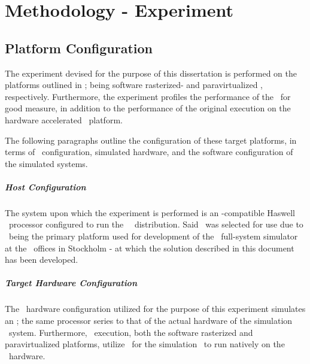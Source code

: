 
\chapter{Methodology - Experiment}
\label{cha:methodologyexperiment}

\section{Platform Configuration}
\label{sec:methodologyexperiment_platformconfiguration}
The experiment devised for the purpose of this dissertation is performed on the platforms outlined in ; being software rasterized- and paravirtualized \dvttermsimics , respectively.
Furthermore, the experiment profiles the performance of the \dvttermreferencesolution\ for good measure, in addition to the performance of the original execution on the hardware accelerated \dvttermhost\ platform. %

The following paragraphs outline the configuration of these target platforms, in terms of \dvttermhost\ configuration, simulated hardware, and the software configuration of the simulated systems.

\paragraph{Host Configuration}
\label{par:methodologyexperiment_platformconfiguration_hostconfiguration}
The system upon which the experiment is performed is an \dvttermxeightysix -compatible Haswell \dvttermintel\ processor configured to run the \dvttermfedora\ \dvttermlinux\ distribution.
Said \dvttermos\ was selected for use due to \dvttermfedora\ being the primary platform used for development of the \dvttermsimics\ full-system simulator at the \dvttermintel\ offices in Stockholm - at which the solution described in this document has been developed.


\paragraph{Target Hardware Configuration}
\label{par:methodologyexperiment_platformconfiguration:targethardwareconfiguration}
The \dvttermsimics\ hardware configuration utilized for the purpose of this experiment simulates an \dvttermintelcoreiseven ; the same processor series to that of the actual hardware of the simulation \dvttermhost\ system.
Furthermore, \dvttermsimics\ execution, both the software rasterized and paravirtualized platforms, utilize \dvttermkvm\ for the simulation \dvttermtarget\ to run natively on the \dvttermhost\ hardware.

